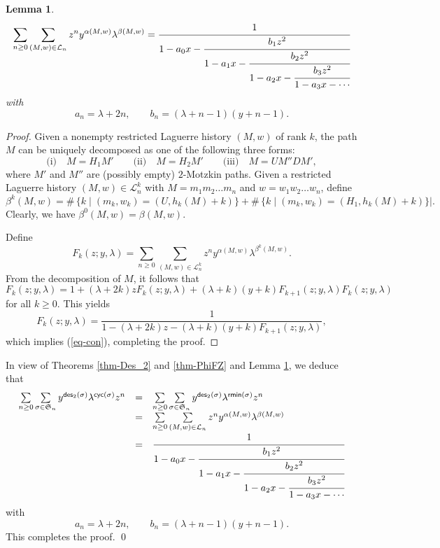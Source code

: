 \documentclass[12pt]{article}
\numberwithin{equation}{section}
\theoremstyle{plain}
\newtheorem{lemma}[theorem]{Lemma}
\def\des{\mathsf{des}}
\def\cyc{\mathsf{cyc}}
\def\rmin{\mathsf{rmin}}
\def\L{\mathcal{L}}
\begin{document}
     
     \begin{lemma}\label{lem-gen}
     	\begin{equation}\label{eq-con}
     	\sum_{n\geq 0}\sum_{(M, w)\in \mathcal{L}_n} z^ny^{\alpha(M,w)}\lambda^{\beta(M,w)}=\cfrac{1}{
     		1-a_0x-\cfrac{b_1z^2}{
     			1-a_1x-\cfrac{b_2 z^2}{
     				1-a_2x-\cfrac{b_3 z^2}{
     					1-a_3x-\cdots
     	}}}}
     	\end{equation}
     	with
     	\[
     a_n = \lambda + 2n,\qquad
    b_n = (\lambda + n-1 )(y + n -1).
     	\]
     	\end{lemma}
     	\begin{proof}
     		Given a  nonempty restricted Laguerre history    $(M,w)$ of rank $k$,  the path $M$ can be uniquely decomposed as   one of the
     		following three forms:
     		\[
     		\text{(i)}\quad  M=H_1M'
     		\qquad
     		\text{(ii)}\quad M=H_2M'
     		\qquad
     		\text{(iii)}\quad M=UM''DM',
     		\]
     		where $M'$ and $M''$  are  (possibly empty)  $2$-Motzkin paths.   
     		Given a restricted 
     		Laguerre history $(M,w)\in\L^k_{n}$ with $M=m_1m_2\ldots m_n$ and $w=w_1w_2\ldots w_n$,  define
     		$$
     		\beta^k(M,w)=  \#\,\{k\mid (m_k, w_k)=(U, h_k(M)+k)\}+\#\,\{k\mid (m_k, w_k)=(H_1, h_k(M)+k)\}|.
     		$$
     		Clearly, we have $\beta^{0}(M,w)=\beta(M,w)$.
     		
     		Define
     		$$
     		F_k(z;y,\lambda)=\sum_{n\geq 0}\sum_{(M, w)\in \mathcal{L}^k_n} z^ny^{\alpha(M,w)}\lambda^{\beta^k(M,w)}.
     		$$
     	From the decomposition of $M$, it follows that 
     	$$
     	F_k(z;y, \lambda)=1+(\lambda+2k)zF_{k}(z;y,\lambda)+(\lambda+k)(y+k)F_{k+1}(z;y,\lambda)F_{k}(z;y, \lambda)
     	$$
     	for all $k\geq 0$. 
     	This yields
     	\[
     	F_k(z;y,\lambda)=\frac{1}{1-(\lambda+2k)z-(\lambda+k)(y+k)F_{k+1}(z;y,\lambda)},
     	\]
     	which implies (\ref{eq-con}), completing the proof. 
     		\end{proof}
     		
     		  In view of Theorems \ref{thm-Des_2} and  \ref{thm-PhiFZ} and Lemma \ref{lem-gen}, we deduce that
     			\[
     			\begin{array}{lll}
     		\sum\limits_{n\geq 0}\sum\limits_{\sigma\in \mathfrak{S}_n}y^{\des_2(\sigma)}\lambda^{\cyc(\sigma)}z^{n}&=&\sum\limits_{n\geq 0}\sum\limits_{\sigma\in \mathfrak{S}_n}y^{\des_2(\sigma)}\lambda^{\rmin(\sigma)}z^{n}\\
     		&=&	\sum\limits_{n\geq 0}\sum\limits_{(M, w)\in \mathcal{L}_n} z^ny^{\alpha(M,w)}\lambda^{\beta(M,w)}\\
     		&=&\cfrac{1}{
     			1-a_0x-\cfrac{b_1 z^2}{
     				1-a_1x-\cfrac{b_2z^2}{
     					1-a_2x-\cfrac{b_3 z^2}{
     						1-a_3x-\cdots
     		}}}}
     	\end{array}
     		\]
     		with
     		\[
     		a_n = \lambda + 2n,\qquad
     		b_n = (\lambda + n -1)(y + n -1).
     		\]
     		This completes the proof. \qed
\end{document}
